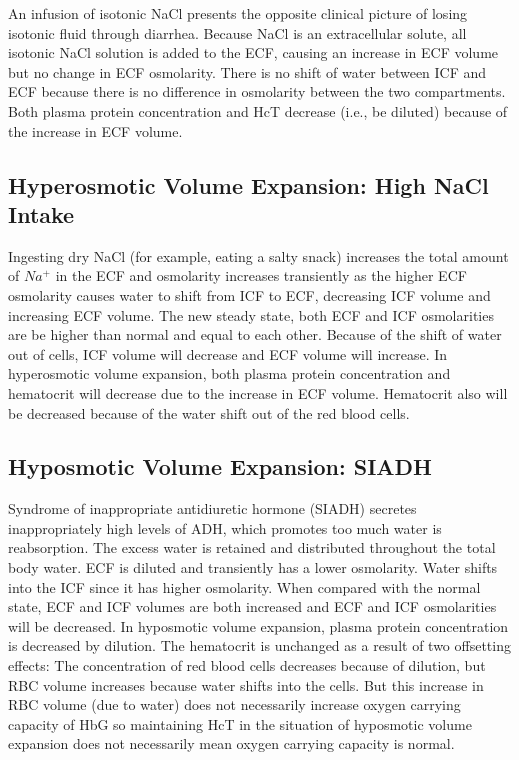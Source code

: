An infusion of isotonic NaCl presents the opposite clinical picture of losing isotonic fluid through diarrhea. Because NaCl is an extracellular solute, all isotonic NaCl solution is added to the ECF, causing an increase in ECF volume but no change in ECF osmolarity. There is no shift of water between ICF and ECF because there is no difference in osmolarity between the two compartments. Both plasma protein concentration and HcT decrease (i.e., be diluted) because of the increase in ECF volume. 

\subsection{Hyperosmotic Volume Expansion: High NaCl Intake} 

Ingesting dry NaCl (for example, eating a salty snack) increases the total amount of $Na^+$ in the ECF and osmolarity increases transiently as the higher ECF osmolarity causes water to shift from ICF to ECF, decreasing ICF volume and increasing ECF volume. The new steady state, both ECF and ICF osmolarities are be higher than normal and equal to each other. Because of the shift of water out of cells, ICF volume will decrease and ECF volume will increase. In hyperosmotic volume expansion, both plasma protein concentration and hematocrit will decrease due to the increase in ECF volume. Hematocrit also will be decreased because of the water shift out of the red blood cells. 

\subsection{Hyposmotic Volume Expansion: SIADH} 

Syndrome of inappropriate antidiuretic hormone (SIADH) secretes inappropriately high levels of ADH, which promotes too much water is reabsorption. The excess water is retained and distributed throughout the total body water. ECF is diluted and transiently has a lower osmolarity. Water shifts into the ICF since it has higher osmolarity. When compared with the normal state, ECF and ICF volumes are both increased and ECF and ICF osmolarities will be decreased. In hyposmotic volume expansion, plasma protein concentration is decreased by dilution. The hematocrit is unchanged as a result of two offsetting effects: The concentration of red blood cells decreases because of dilution, but RBC volume increases because water shifts into the cells. But this increase in RBC volume (due to water) does not necessarily increase oxygen carrying capacity of HbG so maintaining HcT in the situation of hyposmotic volume expansion does not necessarily mean oxygen carrying capacity is normal.





